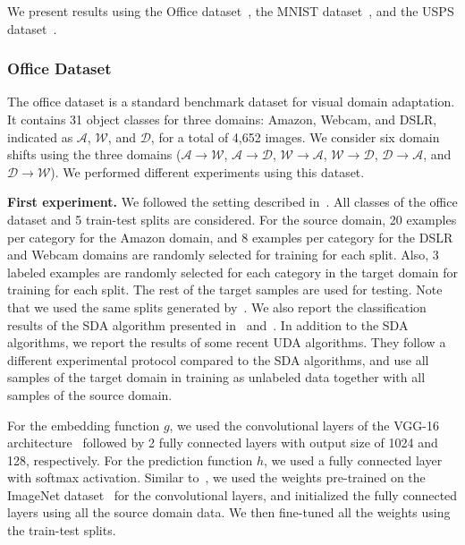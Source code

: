 We present results using the Office dataset~\cite{saenkoKFD2010eccv}, the MNIST dataset~\cite{lecun1998gradient}, and the USPS dataset~\cite{hull1994database}.

\subsubsection{Office Dataset} 

The office dataset is a standard benchmark dataset for visual domain adaptation. It contains 31 object classes for three domains: Amazon, Webcam, and DSLR, indicated as $\mathcal{A}$, $\mathcal{W}$, and $\mathcal{D}$, for a total of 4,652 images. We consider six domain shifts using the three domains ($\mathcal{A} \rightarrow \mathcal{W}$, $\mathcal{A} \rightarrow \mathcal{D}$, $\mathcal{W} \rightarrow \mathcal{A}$, $\mathcal{W} \rightarrow \mathcal{D}$, $\mathcal{D} \rightarrow \mathcal{A}$, and $\mathcal{D} \rightarrow \mathcal{W}$). We performed different experiments using this dataset.

\noindent \textbf{First experiment.} We followed the setting described in~\cite{tzengHDS15iccv}. All classes of the office dataset and 5 train-test splits are considered. For the source domain, 20 examples per category for the Amazon domain, and 8 examples per category for the DSLR and Webcam domains are randomly selected for training for each split. Also, 3 labeled examples are randomly selected for each category in the
target domain for training for each split. The rest of the target samples are used for testing. Note that we used the same splits generated by~\cite{tzengHDS15iccv}. We also report the classification results of the SDA algorithm presented in~\cite{long2015learning} and~\cite{koniusz2016domain}. In addition to the SDA algorithms, we report the results of some recent UDA algorithms. They follow a different experimental protocol compared to the SDA algorithms, and use all samples of the target domain in training as unlabeled data together with all samples of the source domain. 

\begin{comment}
So, we cannot make an exact comparison between results. However, since UDA algorithms use all samples of the target domain in training and we use only very few of them (3 per class), we think it is still worth looking at how they differ.
\end{comment}

For the embedding function $g$, we used the convolutional layers of the VGG-16 architecture~\cite{Simonyan14c} followed by 2 fully connected layers with output size of 1024 and 128, respectively. For the prediction function $h$, we used a fully connected layer with softmax activation. Similar to~\cite{tzengHDS15iccv}, we used the weights pre-trained on the ImageNet dataset~\cite{imagenet2015} for the convolutional layers, and initialized the fully connected layers using all the source domain data. We then fine-tuned all the weights using the train-test splits.

